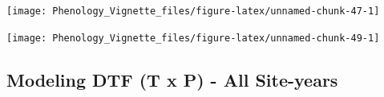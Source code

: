 \documentclass[
]{article}
\newenvironment{Shaded}{\begin{snugshade}}{\end{snugshade}}
\newcommand{\CommentTok}[1]{\textcolor[rgb]{0.56,0.35,0.01}{\textit{#1}}}
\newcommand{\DataTypeTok}[1]{\textcolor[rgb]{0.13,0.29,0.53}{#1}}
\newcommand{\DecValTok}[1]{\textcolor[rgb]{0.00,0.00,0.81}{#1}}
\newcommand{\KeywordTok}[1]{\textcolor[rgb]{0.13,0.29,0.53}{\textbf{#1}}}
\newcommand{\NormalTok}[1]{#1}
\newcommand{\OperatorTok}[1]{\textcolor[rgb]{0.81,0.36,0.00}{\textbf{#1}}}
\newcommand{\StringTok}[1]{\textcolor[rgb]{0.31,0.60,0.02}{#1}}
\begin{document}
\texttt{[image: Phenology\_Vignette\_files/figure-latex/unnamed-chunk-47-1]}

\begin{Shaded}
\end{Shaded}

\texttt{[image: Phenology\_Vignette\_files/figure-latex/unnamed-chunk-49-1]}

\hypertarget{modeling-dtf-t-x-p---all-site-years}{%
\subsection{Modeling DTF (T x P) - All
Site-years}\label{modeling-dtf-t-x-p---all-site-years}}
\end{document}
